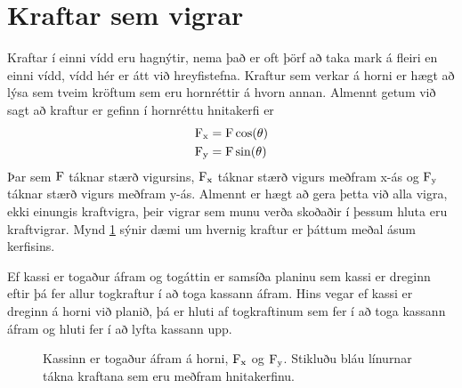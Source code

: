 \section{Kraftar sem vigrar}
Kraftar í einni vídd eru hagnýtir, nema það er oft þörf að taka mark á fleiri
en einni vídd, vídd hér er átt við hreyfistefna. Kraftur sem verkar á horni er
hægt að lýsa sem tveim kröftum sem eru hornréttir á hvorn annan. Almennt getum 
við sagt að kraftur er gefinn í hornréttu hnitakerfi er
\begin{align}
	\textrm{F}_\text{x} &= \textrm{F} \cos(\theta)\\
	\textrm{F}_\text{y} &= \textrm{F} \sin(\theta)
\end{align}
Þar sem $\textrm{F}$ táknar stærð vigursins, $\textrm{F}_\text{x}$ táknar stærð vigurs 
meðfram x-ás og $\textrm{F}_\text{y}$ táknar stærð vigurs meðfram y-ás. Almennt er
hægt að gera þetta við alla vigra, ekki einungis kraftvigra, þeir vigrar sem munu
verða skoðaðir í þessum hluta eru kraftvigrar. Mynd \ref{basic:fig:twodimforces}
sýnir dæmi um hvernig kraftur er þáttum meðal ásum kerfisins.

Ef kassi er togaður áfram og togáttin er samsíða planinu sem kassi er dreginn eftir
þá fer allur togkraftur í að toga kassann áfram. Hins vegar ef kassi er dreginn
á horni við planið, þá er hluti af togkraftinum sem fer í að toga kassann áfram
og hluti fer í að lyfta kassann upp.

\begin{figure}[!htb]
\label{basic:fig:twodimforces}
\centering
\def\iangle{35} %
\def\down{-90}
\def\arcr{0.45cm} %
\caption{
	Kassinn er togaður áfram á horni, $\textrm{F}_\text{x}$ og $\textrm{F}_\text{y}$.
	Stikluðu bláu línurnar tákna kraftana sem eru meðfram hnitakerfinu.
	}
\end{figure}

